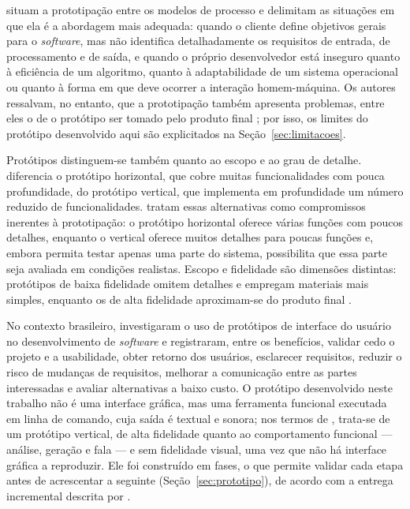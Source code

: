 \documentclass[
    12pt,                   %
    openright,              %
    oneside,                %
    a4paper,                %
    sumario=tradicional,    %
    english,                %
    brazil,                 %
    ]{abntex2}
\begin{document}
\textcite{pressman2021} situam a prototipação entre os modelos de processo e delimitam as situações em que ela é a abordagem mais adequada: quando o cliente define objetivos gerais para o \textit{software}, mas não identifica detalhadamente os requisitos de entrada, de processamento e de saída, e quando o próprio desenvolvedor está inseguro quanto à eficiência de um algoritmo, quanto à adaptabilidade de um sistema operacional ou quanto à forma em que deve ocorrer a interação homem-máquina. Os autores ressalvam, no entanto, que a prototipação também apresenta problemas, entre eles o de o protótipo ser tomado pelo produto final \cite{pressman2021}; por isso, os limites do protótipo desenvolvido aqui são explicitados na Seção~\ref{sec:limitacoes}.

Protótipos distinguem-se também quanto ao escopo e ao grau de detalhe. \textcite{nielsen1993} diferencia o protótipo horizontal, que cobre muitas funcionalidades com pouca profundidade, do protótipo vertical, que implementa em profundidade um número reduzido de funcionalidades. \textcite{rogers2013} tratam essas alternativas como compromissos inerentes à prototipação: o protótipo horizontal oferece várias funções com poucos detalhes, enquanto o vertical oferece muitos detalhes para poucas funções e, embora permita testar apenas uma parte do sistema, possibilita que essa parte seja avaliada em condições realistas. Escopo e fidelidade são dimensões distintas: protótipos de baixa fidelidade omitem detalhes e empregam materiais mais simples, enquanto os de alta fidelidade aproximam-se do produto final \cite{rogers2013}.

No contexto brasileiro, \textcite{latinoware7985} investigaram o uso de protótipos de interface do usuário no desenvolvimento de \textit{software} e registraram, entre os benefícios, validar cedo o projeto e a usabilidade, obter retorno dos usuários, esclarecer requisitos, reduzir o risco de mudanças de requisitos, melhorar a comunicação entre as partes interessadas e avaliar alternativas a baixo custo. O protótipo desenvolvido neste trabalho não é uma interface gráfica, mas uma ferramenta funcional executada em linha de comando, cuja saída é textual e sonora; nos termos de \textcite{nielsen1993}, trata-se de um protótipo vertical, de alta fidelidade quanto ao comportamento funcional --- análise, geração e fala --- e sem fidelidade visual, uma vez que não há interface gráfica a reproduzir. Ele foi construído em fases, o que permite validar cada etapa antes de acrescentar a seguinte (Seção~\ref{sec:prototipo}), de acordo com a entrega incremental descrita por \textcite{sommerville2018}.
\end{document}
